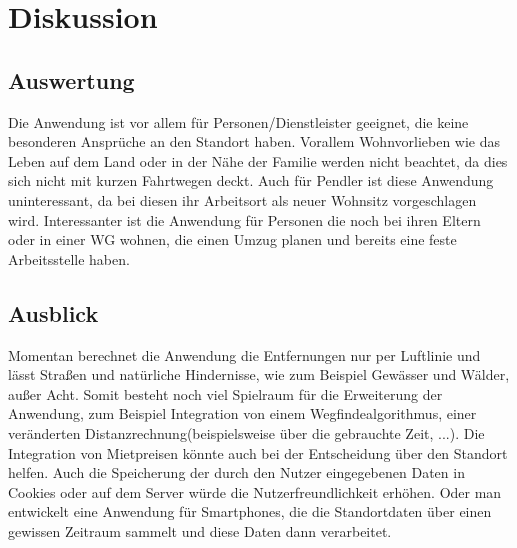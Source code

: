 \documentclass[a4paper, twoside, 12pt]{scrreprt}
\begin{document}
\chapter{Diskussion}
\section{Auswertung}
Die Anwendung ist vor allem für Personen/Dienstleister geeignet, die keine besonderen Ansprüche an den Standort haben.
Vorallem Wohnvorlieben wie das Leben auf dem Land oder in der Nähe der Familie werden nicht beachtet, da dies sich nicht mit kurzen Fahrtwegen deckt.
Auch für Pendler ist diese Anwendung uninteressant, da bei diesen ihr Arbeitsort als neuer Wohnsitz vorgeschlagen wird.
Interessanter ist die Anwendung für Personen die noch bei ihren Eltern oder in einer WG wohnen, die einen Umzug planen und bereits eine feste Arbeitsstelle haben. 
\section{Ausblick}
Momentan berechnet die Anwendung die Entfernungen nur per Luftlinie und lässt Straßen und natürliche Hindernisse, wie zum Beispiel Gewässer und Wälder, außer Acht.
Somit besteht noch viel Spielraum für die Erweiterung der Anwendung, zum Beispiel Integration von einem Wegfindealgorithmus, einer veränderten Distanzrechnung(beispielsweise über die gebrauchte Zeit, ...).
Die Integration von Mietpreisen könnte auch bei der Entscheidung über den Standort helfen.
Auch die Speicherung der durch den Nutzer eingegebenen Daten in Cookies oder auf dem Server würde die Nutzerfreundlichkeit erhöhen. Oder man entwickelt eine Anwendung für Smartphones, die die Standortdaten über einen gewissen Zeitraum sammelt und diese Daten dann verarbeitet.


\end{document}
